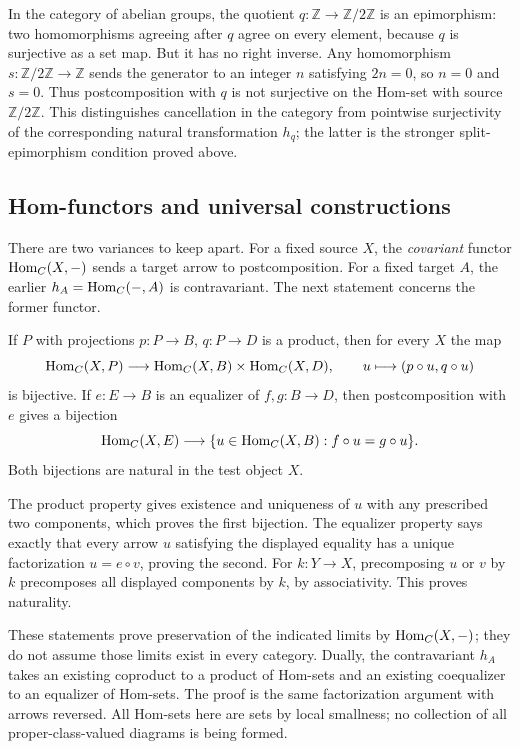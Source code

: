 \begin{example}
In the category of abelian groups, the quotient
$q:\mathbb Z\to\mathbb Z/2\mathbb Z$ is an epimorphism: two
homomorphisms agreeing after $q$ agree on every element, because $q$
is surjective as a set map. But it has no right inverse. Any
homomorphism $s:\mathbb Z/2\mathbb Z\to\mathbb Z$ sends the generator
to an integer $n$ satisfying $2n=0$, so $n=0$ and $s=0$.
Thus postcomposition with $q$ is not surjective on the Hom-set with
source $\mathbb Z/2\mathbb Z$. This distinguishes cancellation in the
category from pointwise surjectivity of the corresponding natural
transformation $h_q$; the latter is the stronger split-epimorphism
condition proved above.
\end{example}


\subsection{Hom-functors and universal constructions}
There are two variances to keep apart. For a fixed source $X$, the
\emph{covariant} functor ${\textrm{Hom}}_C(X,-)$ sends a target arrow to
postcomposition. For a fixed target $A$, the earlier $h_A={\textrm{Hom}}_C(-,A)$
is contravariant. The next statement concerns the former functor.

\begin{proposition}
If $P$ with projections $p:P\to B$, $q:P\to D$ is a product, then
for every $X$ the map
\[
{\textrm{Hom}}_C(X,P)\longrightarrow{\textrm{Hom}}_C(X,B)\times{\textrm{Hom}}_C(X,D),
\qquad u\longmapsto(p\circ u,q\circ u)
\]
is bijective. If $e:E\to B$ is an equalizer of $f,g:B\to D$, then
postcomposition with $e$ gives a bijection
\[
{\textrm{Hom}}_C(X,E)\longrightarrow
\{u\in{\textrm{Hom}}_C(X,B):f\circ u=g\circ u\}.
\]
Both bijections are natural in the test object $X$.
\end{proposition}
\Proof
The product property gives existence and uniqueness of $u$ with any
prescribed two components, which proves the first bijection. The
equalizer property says exactly that every arrow $u$ satisfying the
displayed equality has a unique factorization $u=e\circ v$, proving
the second. For $k:Y\to X$, precomposing $u$ or $v$ by $k$ precomposes
all displayed components by $k$, by associativity. This proves naturality.
\Done

These statements prove preservation of the indicated limits by
${\textrm{Hom}}_C(X,-)$; they do not assume those limits exist in every category.
Dually, the contravariant $h_A$ takes an existing coproduct to a product
of Hom-sets and an existing coequalizer to an equalizer of Hom-sets.
The proof is the same factorization argument with arrows reversed.
All Hom-sets here are sets by local smallness; no collection of all
proper-class-valued diagrams is being formed.

